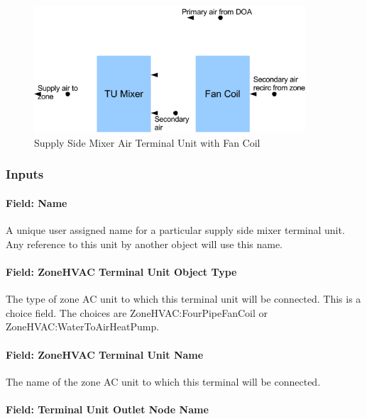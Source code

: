 \begin{figure}[hbtp] %
\centering
\includegraphics[width=0.9\textwidth, height=0.9\textheight, keepaspectratio=true]{media/image276.png}
\caption{Supply Side Mixer Air Terminal Unit with Fan Coil \protect \label{fig:supply-side-mixer-air-terminal-unit-with-fan}}
\end{figure}

\subsubsection{Inputs}\label{inputs-13-000}

\paragraph{Field: Name}\label{field-name-13}

A unique user assigned name for a particular supply side mixer terminal unit. Any reference to this unit by another object will use this name.

\paragraph{Field: ZoneHVAC Terminal Unit Object Type}\label{field-zonehvac-terminal-unit-object-type-1}

The type of zone AC unit to which this terminal unit will be connected. This is a choice field. The choices are ZoneHVAC:FourPipeFanCoil or ZoneHVAC:WaterToAirHeatPump.

\paragraph{Field: ZoneHVAC Terminal Unit Name}\label{field-zonehvac-terminal-unit-name-1}

The name of the zone AC unit to which this terminal will be connected.

\paragraph{Field: Terminal Unit Outlet Node Name}\label{field-terminal-unit-outlet-node-name-1}

